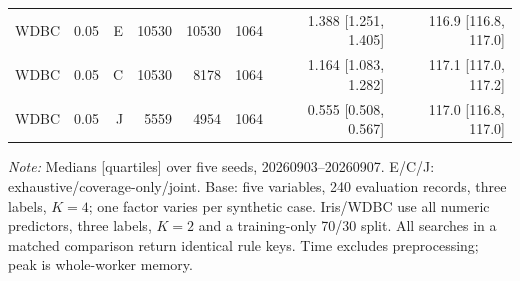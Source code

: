 \begin{table}[t]
\begin{tabular}{lrrrrrrr}
WDBC & 0.05 & E & 10530 & 10530 & 1064 & 1.388 [1.251, 1.405] & 116.9 [116.8, 117.0] \\
WDBC & 0.05 & C & 10530 & 8178 & 1064 & 1.164 [1.083, 1.282] & 117.1 [117.0, 117.2] \\
WDBC & 0.05 & J & 5559 & 4954 & 1064 & 0.555 [0.508, 0.567] & 117.0 [116.8, 117.0] \\
\bottomrule
\end{tabular}
\par\vspace{0.4ex}\footnotesize\emph{Note:} Medians [quartiles] over five seeds, 20260903--20260907. E/C/J: exhaustive/coverage-only/joint. Base: five variables, 240 evaluation records, three labels, $K=4$; one factor varies per synthetic case. Iris/WDBC use all numeric predictors, three labels, $K=2$ and a training-only 70/30 split. All searches in a matched comparison return identical rule keys. Time excludes preprocessing; peak is whole-worker memory.
\end{table}
